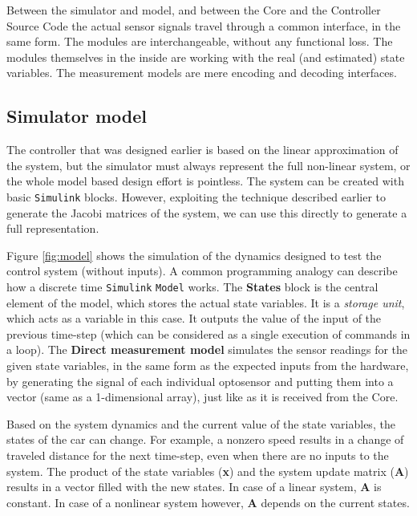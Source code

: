 Between the simulator and model, and between the Core and the Controller Source Code the actual sensor signals travel through a common interface, in the same form. The modules are interchangeable, without any functional loss. The modules themselves in the inside are working with the real (and estimated) state variables. The measurement models are mere encoding and decoding interfaces.


\subsection{Simulator model}

The controller that was designed earlier is based on the linear approximation of the system, but the simulator must always represent the full non-linear system, or the whole model based design effort is pointless. The system can be created with basic \verb!Simulink! blocks. However, exploiting the technique described earlier to generate the Jacobi matrices of the system, we can use this directly to generate a full representation.

Figure \ref{fig:model} shows the simulation of the dynamics designed to test the control system (without inputs). A common programming analogy can describe how a discrete time \verb!Simulink! \verb!Model! works. The \textbf{States} block is the central element of the model, which stores the actual state variables. It is a \emph{storage unit}, which acts as a variable in this case. It outputs the value of the input of the previous time-step (which can be considered as a single execution of commands in a loop). The \textbf{Direct measurement model} simulates the sensor readings for the given state variables, in the same form as the expected inputs from the hardware, by generating the signal of each individual optosensor and putting them into a vector (same as a 1-dimensional array), just like as it is received from the Core.

Based on the system dynamics and the current value of the state variables, the states of the car can change. For example, a nonzero speed results in a change of traveled distance for the next time-step, even when there are no inputs to the system. The product of the state variables (\textbf{x}) and the system update matrix (\textbf{A}) results in a vector filled with the new states. In case of a linear system, \textbf{A} is constant. In case of a nonlinear system however, \textbf{A} depends on the current states. 

